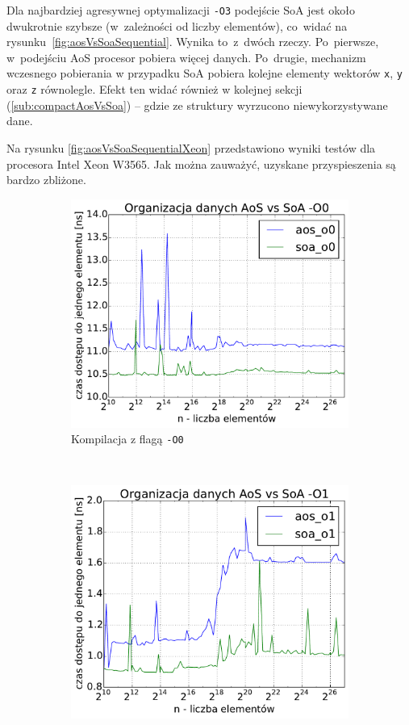 Dla najbardziej agresywnej optymalizacji \texttt{-O3} podejście SoA jest około dwukrotnie szybsze (w~zależności od liczby elementów), co~widać na rysunku~\ref{fig:aosVsSoaSequential}. Wynika to~z~dwóch rzeczy. Po~pierwsze, w~podejściu AoS procesor pobiera więcej danych. Po~drugie, mechanizm wczesnego pobierania w przypadku SoA pobiera kolejne elementy wektorów \texttt{x}, \texttt{y} oraz \texttt{z} równolegle. Efekt ten widać również w kolejnej sekcji (\ref{sub:compactAosVsSoa}) -- gdzie ze struktury wyrzucono niewykorzystywane dane.


Na rysunku \ref{fig:aosVsSoaSequentialXeon} przedstawiono wyniki testów dla procesora Intel Xeon W3565. Jak można zauważyć, uzyskane przyspieszenia są bardzo zbliżone.

\begin{figure}
    \centering
    \begin{subfigure}[c]{0.45\textwidth}
        \centering
        \includegraphics[width=\textwidth]{images/benchs/aos_vs_soa_O0}
        \caption{Kompilacja z flagą \texttt{-O0}}
    \end{subfigure}
    ~
    \begin{subfigure}[c]{0.45\textwidth}
        \centering
        \includegraphics[width=\textwidth]{images/benchs/aos_vs_soa_O1}

\end{subfigure}
\end{figure}
